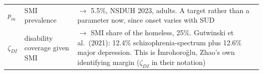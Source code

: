 \begin{longtable}{@{}lL{3.6cm}L{7.4cm}@{}}
$p_m$ & SMI prevalence & $\rightarrow$ 5.5\%, NSDUH 2023, adults. A target rather than a parameter now, since onset varies with SUD  \\
$\zeta_{DI}$ & disability coverage given SMI & $\rightarrow$ SMI share of the homeless, 25\%. Gutwinski et al.\ (2021): 12.4\% schizophrenia-spectrum plus 12.6\% major depression. This is \.{I}mrohoro\u{g}lu, Zhao's own identifying margin ($\zeta_{DI}$ in their notation)  \\
\bottomrule
\end{longtable}

